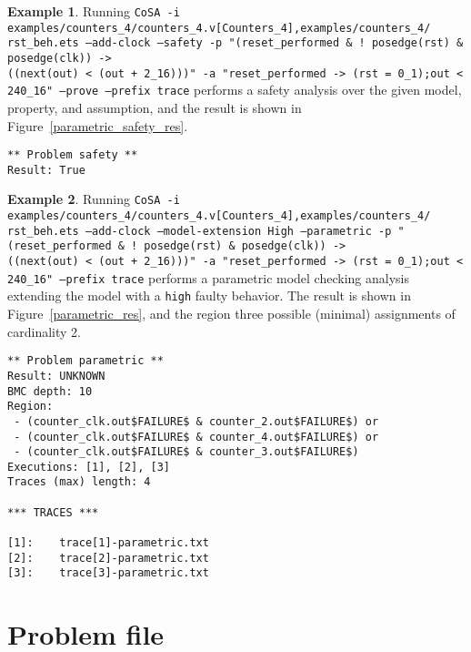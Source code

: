\documentclass{article}
\theoremstyle{definition}
\newtheorem{example}{Example}[section]
\begin{document}
\begin{example}
  \label{ex:param_nominal}
  Running \texttt{CoSA -i
    examples/counters\_4/counters\_4.v[Counters\_4],examples/counters\_4/
    rst\_beh.ets
    --add-clock --safety -p "(reset\_performed \& ! posedge(rst) \&
    posedge(clk)) -> \\((next(out) < (out + 2\_16)))" -a
    "reset\_performed -> (rst = 0\_1);out < 240\_16" --prove --prefix trace}
  performs a safety analysis over the given model, property, and
  assumption, and the result is shown in Figure~\ref{parametric_safety_res}.

\begin{lstlisting}[frame=single,language=ets,caption=Safety analysis example,label=parametric_safety_res]
** Problem safety **
Result: True
\end{lstlisting}

\end{example}

\begin{example}
\label{ex:param_extended}
  Running \texttt{CoSA -i
    examples/counters\_4/counters\_4.v[Counters\_4],examples/counters\_4/
    rst\_beh.ets --add-clock --model-extension High --parametric -p
    "(reset\_performed \& ! posedge(rst) \& posedge(clk))
    ->\\ ((next(out) < (out + 2\_16)))" -a "reset\_performed -> (rst =
    0\_1);out < 240\_16" --prefix trace} performs a parametric model
  checking analysis extending the model with a \texttt{high} faulty
  behavior. The result is shown in Figure~\ref{parametric_res}, and
  the region three possible (minimal) assignments of cardinality 2.

\begin{lstlisting}[frame=single,language=ets,caption=Parametric analysis example,label=parametric_res]
** Problem parametric **
Result: UNKNOWN
BMC depth: 10
Region:
 - (counter_clk.out$FAILURE$ & counter_2.out$FAILURE$) or 
 - (counter_clk.out$FAILURE$ & counter_4.out$FAILURE$) or 
 - (counter_clk.out$FAILURE$ & counter_3.out$FAILURE$)
Executions: [1], [2], [3]
Traces (max) length: 4

*** TRACES ***

[1]:	trace[1]-parametric.txt
[2]:	trace[2]-parametric.txt
[3]:	trace[3]-parametric.txt
\end{lstlisting}

\end{example}


\section{Problem file}
\label{sec:problem_file}
\end{document}
